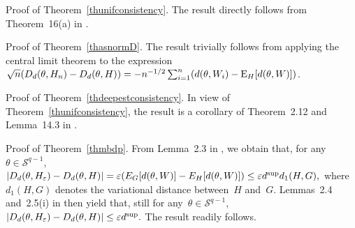 \documentclass[usenames,dvipsnames]{article}
\begin{document}

Proof of Theorem~\ref{thunifconsistency}.
The result directly follows from Theorem~16(a) in \cite{Fer1996}.
\cqfd
\vspace{3mm}


Proof of Theorem~\ref{thasnormD}.
The result trivially follows from applying the central limit theorem to the expression~$
\sqrt{n}(D_{d}(\theta, H_n)-D_{d}(\theta, H))
=
-n^{-1/2} \sum_{i=1}^n (d(\theta,W_i)- {\rm E}_H[d(\theta,W)])
$.
\cqfd
\vspace{3mm}


Proof of Theorem~\ref{thdeepestconsistency}.
In view of Theorem~\ref{thunifconsistency}, the result is a corollary of Theorem~2.12 and Lemma~14.3 in \cite{Kos2008}.
\cqfd
\vspace{3mm}


Proof of Theorem~\ref{thmbdp}.
From Lemma~2.3 in \cite{str1985}, we obtain that, for any~$\theta\in\mathcal{S}^{q-1}$, 
$
| D_{d}(\theta,H_\varepsilon)-D_{d}(\theta,H) |
=
\varepsilon (E_G[d(\theta,W)]-E_H[d(\theta,W)])
\leq 
\varepsilon d^{\rm sup} d_1(H,G)
,
$
where $d_1(H,G)$ denotes the variational distance between~$H$ and~$G$. %
Lemmas~2.4 and~2.5(i) in \cite{str1985} then yield that, still for any~$\theta\in\mathcal{S}^{q-1}$,
$
| D_{d}(\theta,H_\varepsilon)-D_{d}(\theta,H) |
\leq
\varepsilon d^{\rm sup}
.
$
The result readily follows.
\cqfd
\vspace{3mm}









           
\vspace{3mm} 
\end{document}
